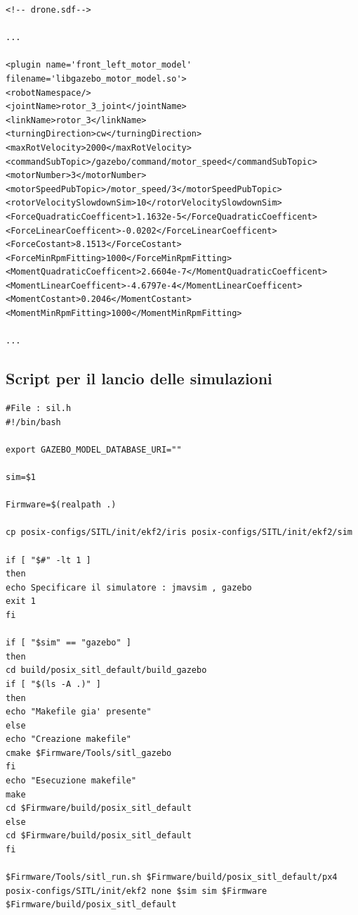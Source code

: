 \lstset{language=XML}
\begin{lstlisting}
<!-- drone.sdf-->

...

<plugin name='front_left_motor_model' filename='libgazebo_motor_model.so'>
<robotNamespace/>
<jointName>rotor_3_joint</jointName>
<linkName>rotor_3</linkName>
<turningDirection>cw</turningDirection>
<maxRotVelocity>2000</maxRotVelocity>
<commandSubTopic>/gazebo/command/motor_speed</commandSubTopic>
<motorNumber>3</motorNumber>
<motorSpeedPubTopic>/motor_speed/3</motorSpeedPubTopic>
<rotorVelocitySlowdownSim>10</rotorVelocitySlowdownSim>
<ForceQuadraticCoefficent>1.1632e-5</ForceQuadraticCoefficent>
<ForceLinearCoefficent>-0.0202</ForceLinearCoefficent>
<ForceCostant>8.1513</ForceCostant>
<ForceMinRpmFitting>1000</ForceMinRpmFitting>
<MomentQuadraticCoefficent>2.6604e-7</MomentQuadraticCoefficent>
<MomentLinearCoefficent>-4.6797e-4</MomentLinearCoefficent>
<MomentCostant>0.2046</MomentCostant>
<MomentMinRpmFitting>1000</MomentMinRpmFitting>

...

\end{lstlisting}

\subsection{Script per il lancio delle simulazioni}

\lstset{language=bash}
\begin{lstlisting}
#File : sil.h
#!/bin/bash

export GAZEBO_MODEL_DATABASE_URI=""

sim=$1

Firmware=$(realpath .)

cp posix-configs/SITL/init/ekf2/iris posix-configs/SITL/init/ekf2/sim

if [ "$#" -lt 1 ]
then
echo Specificare il simulatore : jmavsim , gazebo
exit 1
fi

if [ "$sim" == "gazebo" ] 
then
cd build/posix_sitl_default/build_gazebo
if [ "$(ls -A .)" ]
then
echo "Makefile gia' presente"
else
echo "Creazione makefile"
cmake $Firmware/Tools/sitl_gazebo
fi
echo "Esecuzione makefile"
make
cd $Firmware/build/posix_sitl_default
else
cd $Firmware/build/posix_sitl_default
fi

$Firmware/Tools/sitl_run.sh $Firmware/build/posix_sitl_default/px4  posix-configs/SITL/init/ekf2 none $sim sim $Firmware $Firmware/build/posix_sitl_default
\end{lstlisting}
